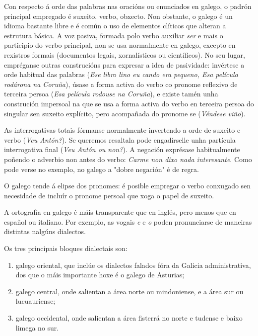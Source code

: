 \begin{multicols}{2}

Con respecto á orde das palabras nas oracións ou enunciados en galego, o padrón principal empregado é suxeito, verbo, obxecto. Non obstante, o galego é un idioma bastante libre e é común o uso de elementos clíticos que alteran a estrutura básica. A voz pasiva, formada polo verbo auxiliar \textit{ser} e mais o participio do verbo principal, non se usa normalmente en galego, excepto en rexistros formais (documentos legais, xornalísticos ou científicos). No seu lugar, empréganse outras construcións para expresar a idea de pasividade: invértese a orde habitual das palabras (\textit{Ese libro lino eu cando era pequeno, Esa película rodárona na Coruña}), úsase a forma activa do verbo co pronome reflexivo de terceira persoa (\textit{Esa película rodouse na Coruña}), e existe tamén unha construción impersoal na que se usa a forma activa do verbo en terceira persoa do singular sen suxeito explícito, pero acompañada do pronome se (\textit{Véndese viño}).
 
As interrogativas totais fórmanse normalmente invertendo a orde de suxeito e verbo (\textit{Veu Antón?}). Se queremos resaltala pode engadírselle unha partícula interrogativa final (\textit{Veu Antón ou non?}). A negación exprésase habitualmente poñendo o adverbio non antes do verbo: \textit{Carme non dixo nada interesante}. Como pode verse no exemplo, no galego a "dobre negación" é de regra.

O galego tende á elipse dos pronomes: é posible empregar o verbo conxugado sen necesidade de incluír o pronome persoal que xoga o papel de suxeito.

A ortografía en galego é máis transparente que en inglés, pero menos que en español ou italiano. Por exemplo, as vogais \textit{e} e \textit{o} poden pronunciarse de maneiras distintas nalgúns dialectos. 

Os tres principais bloques dialectais son:

\begin{enumerate}
\item galego oriental, que inclúe os dialectos falados fóra da Galicia administrativa, dos que o máis importante hoxe é o galego de Asturias;
\item galego central, onde salientan a área norte ou mindoniense, e a área sur ou lucuauriense;
\item galego occidental, onde salientan a área fisterrá no norte e tudense e baixo limega no sur. 
\end{enumerate}


\end{multicols}
